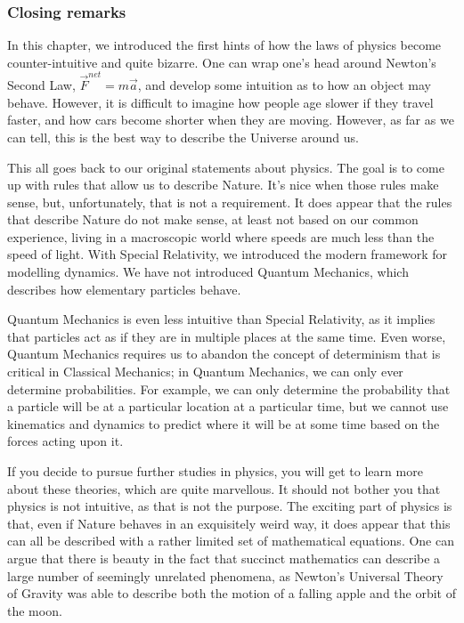 \subsubsection{Closing remarks}

In this chapter, we introduced the first hints of how the laws of physics become counter-intuitive and quite bizarre. One can wrap one's head around Newton's Second Law, $\vec F^{net}=m\vec a$, and develop some intuition as to how an object may behave. However, it is difficult to imagine how people age slower if they travel faster, and how cars become shorter when they are moving. However, as far as we can tell, this is the best way to describe the Universe around us.

This all goes back to our original statements about physics. The goal is to come up with rules that allow us to describe Nature. It's nice when those rules make sense, but, unfortunately, that is not a requirement. It does appear that the rules that describe Nature do not make sense, at least not based on our common experience, living in a macroscopic world where speeds are much less than the speed of light. With Special Relativity, we introduced the modern framework for modelling dynamics. We have not introduced Quantum Mechanics, which describes how elementary particles behave.

Quantum Mechanics is even less intuitive than Special Relativity, as it implies that particles act as if they are in multiple places at the same time. Even worse, Quantum Mechanics requires us to abandon the concept of determinism that is critical in Classical Mechanics; in Quantum Mechanics, we can only ever determine probabilities. For example, we can only determine the probability that a particle will be at a particular location at a particular time, but we cannot use kinematics and dynamics to predict where it will be at some time based on the forces acting upon it.

If you decide to pursue further studies in physics, you will get to learn more about these theories, which are quite marvellous. It should not bother you that physics is not intuitive, as that is not the purpose. The exciting part of physics is that, even if Nature behaves in an exquisitely weird way, it does appear that this can all be described with a rather limited set of mathematical equations. One can argue that there is beauty in the fact that succinct mathematics can describe a large number of seemingly unrelated phenomena, as Newton's Universal Theory of Gravity was able to describe both the motion of a falling apple and the orbit of the moon.

